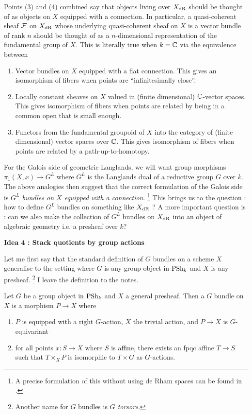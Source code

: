 \documentclass[./main.tex]{subfiles}
\begin{document}
Points (3) and (4) combined say that
objects living over $X_{\mathrm{dR}}$ should be thought of as
objects on $X$ equipped with a connection.
In particular, a quasi-coherent sheaf $\mathcal{F}$ on $X_{\mathrm{dR}}$
whose underlying quasi-coherent sheaf on $X$ is a 
vector bundle of rank $n$ should be thought of as a $n$-dimensional 
representation of the fundamental group of $X$.
This is literally true when $k = \mathbb{C}$ via the equivalence
between 
\begin{enumerate}
  \item Vector bundles on $X$ equipped with a flat connection.
  This gives an isomorphism of fibers when points are
  ``infinitesimally close''.
  \item Locally constant sheaves on $X$ valued in 
  (finite dimensional) $\mathbb{C}$-vector spaces.
  This gives isomorphism of fibers when points are related by
  being in a common open that is small enough.
  \item Functors from the fundamental groupoid of $X$ into 
  the category of (finite dimensional) vector spaces over $\mathbb{C}$.
  This gives isomorphism of fibers when points are related by
  a path-up-to-homotopy.
\end{enumerate}

For the Galois side of geometric Langlands,
we will want group morphisms $\pi_1(X , x) \to G^L$ where
$G^L$ is the Langlands dual of a reductive group $G$ over $k$.
The above analogies then suggest that
the correct formulation of the Galois side is 
\emph{$G^L$ bundles on $X$ equipped with a connection}.
\footnote{
  A precise formulation of this without using de Rham spaces
  can be found in \cite{BB-93}.
}
This brings us to the question : how to define
$G^L$ bundles on something like $X_{\mathrm{dR}}$ ?
A more important question is : 
can we also make the collection of $G^L$ bundles on $X_{\mathrm{dR}}$
into an object of algebraic geometry i.e. a presheaf over $k$? 

\textbf{Idea 4 : Stack quotients by group actions}

Let me first say that the standard definition of
$G$ bundles on a scheme $X$
generalise to the setting where 
$G$ is any group object in $\operatorname{PSh}_k$ and $X$ is any presheaf.
\footnote{
  Another name for $G$ bundles is \emph{$G$ torsors}.
}
I leave the definition to the notes.
\begin{dfn}

  Let $G$ be a group object in $\operatorname{PSh}_k$
  and $X$ a general presheaf.
  Then a $G$ bundle on $X$ is 
  a morphism $P \to X$ where
  \begin{enumerate}
    \item $P$ is equipped with a right $G$-action, $X$ the trivial action, 
    and $P \to X$ is $G$-equivariant
    \item for all points $x : S \to X$ where $S$ is affine,
    there exists an fpqc affine $T \to S$ such that
    $T \times_X P$ is isomorphic to $T \times G$ as $G$-actions.
  \end{enumerate}
\end{dfn}
\end{document}
